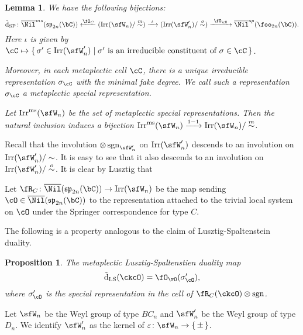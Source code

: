 \documentclass[12pt,a4paper]{amsart}
\def\fsp{\mathfrak{sp}}
\def\fso{\mathfrak{so}}
\newcommand{\sgn}{\operatorname{sgn}}
\numberwithin{equation}{section}
\newtheorem{lem}[thm]{Lemma}
\newtheorem{prop}[thm]{Proposition}
\theoremstyle{remark}
\def\tdLS{\tilde{\mathrm{d}}_{\mathrm{LS}}}
\def\tdSP{\tilde{\mathrm{d}}_{\mathrm{SP}}}
\begin{document}
\begin{lem}
  We have the following bijections:
  \[
  \tdSP \colon
    \bNil^{ms}(\fsp_{2n}(\bC))\xleftarrow{\Springer_{C}} (\Irr(\sfW_{n})/\msim )\xrightarrow{\ \iota \ } (\Irr(\sfW'_{n})/\osim )\xrightarrow{\ \SpringerO \ } \bNil^{sp}(\foo_{2n}(\bC)).
  \]
  Here $\iota$ is given by $\cC\mapsto \set{\sigma'\in \Irr(\sfW'_{n})| \text{$\sigma'$ is an
      irreducible constituent of $\sigma\in \cC$}}$.

  Moreover, in each metaplectic cell $\cC$, there is a unique irreducible
  representation $\sigma_{\cC}$ with the minimal fake
  degree. We call such a representation $\sigma_{\cC}$ a metaplectic special
  representation.

  Let $\Irrms(\sfW_{n})$ be the set of metaplectic special representations.
  Then the natural inclusion induces a bijection
  $\Irrms(\sfW_{n})\xrightarrow{1-1} \Irr(\sfW_{n})/\msim$.
\end{lem}

Recall that the involution $\otimes \sgn_{\sfW'_{n}}$ on $\Irr(\sfW'_{n})$ descends to an involution
on $\Irr(\sfW'_{n})/\sim$.
It is easy to see that it
also descends to an
involution on $\Irr(\sfW'_{n})/\osim$.
It is clear by Lusztig that



Let $\RSp\colon \bNil(\fsp_{2n}(\bC))\rightarrow \Irr(\sfW_{n})$ be the map sending
$\cO\in \bNil(\fsp_{2n}(\bC))$ to the representation attached to the trivial
local system on $\cO$ under the Springer correspondence for type $C$.


The following is a property analogous to the claim of Lusztig-Spaltenstein duality.
\begin{prop}
  The metaplectic Lusztig-Spaltenstien duality map
  \[
    \tdLS(\ckcO) = \SpringerO(\sigma'_{\cO}),
  \]
  where $\sigma'_{\cO}$ is the special representation in the cell of $\RSp(\ckcO)\otimes \sgn$.
\end{prop}


Let $\sfW_{n}$ be the Weyl group of type $BC_{n}$ and $\sfW'_{n}$ be the Weyl
group of type $D_{n}$. We identify $\sfW'_{n}$ as the kernel of
$\varepsilon\colon \sfW_{n}\rightarrow \set{\pm}$.
\end{document}
